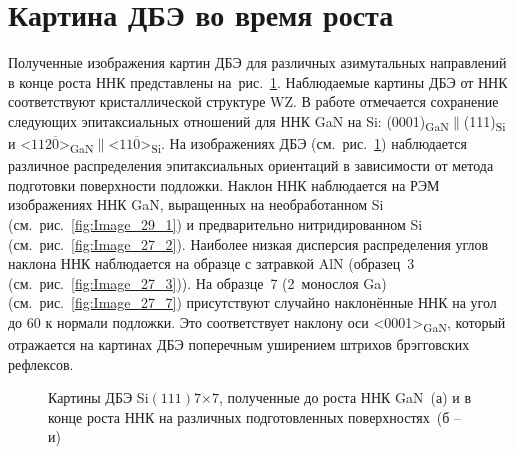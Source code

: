 \section{Картина ДБЭ во время роста}\label{sec:ch4/sec3}

Полученные изображения картин ДБЭ для различных азимутальных направлений в
конце роста ННК представлены на~рис.~\cref{fig:Image_29}. Наблюдаемые картины
ДБЭ от ННК соответствуют кристаллической структуре WZ. В работе
\cite{Wierzbicka2013} отмечается сохранение следующих эпитаксиальных отношений
для ННК GaN на Si:
(0001)\textsubscript{GaN}\(\parallel\)(111)\textsubscript{Si} и
<\(112\overline{0}\)>\textsubscript{GaN}\(\parallel\)<\(11\overline{0}\)>\textsubscript{Si}.
На изображениях ДБЭ (см.~рис.~\cref{fig:Image_29}) наблюдается различное
распределения эпитаксиальных ориентаций в зависимости от метода подготовки
поверхности подложки. Наклон ННК наблюдается на РЭМ изображениях ННК GaN,
выращенных на необработанном Si (см.~рис.~\cref{fig:Image_29_1}) и
предварительно нитридированном Si (см.~рис.~\cref{fig:Image_27_2}). Наиболее
низкая дисперсия распределения углов наклона ННК наблюдается на образце с
затравкой AlN (образец~3 (см.~рис.~\cref{fig:Image_27_3})). На образце~7
(2~монослоя Ga) (см.~рис.~\cref{fig:Image_27_7}) присутствуют случайно
наклонённые ННК на угол до 60{\textdegree} к нормали подложки. Это
соответствует наклону оси <0001>\textsubscript{GaN}, который отражается на
картинах ДБЭ поперечным уширением штрихов брэгговских рефлексов.

\begin{figure}[ht]   \caption{Картины ДБЭ
				Si\((111)7\)\(\times\)\(7\), полученные до роста ННК GaN~(а) и в конце
				роста ННК на различных подготовленных поверхностях~(б --
		и)}\label{fig:Image_29} \end{figure}

